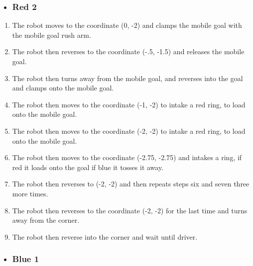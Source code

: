 \begin{itemize}
    \item \subsubsection{Red 2}
\end{itemize}
\begin{enumerate}
    \item The robot moves to the coordinate (0, -2) and clamps the mobile goal with the mobile goal rush arm.
    \item The robot then reverses to the coordinate (-.5, -1.5) and releases the mobile goal.
    \item The robot then turns away from the mobile goal, and reverses into the goal and clamps onto the mobile goal.
    \item The robot then moves to the coordinate (-1, -2) to intake a red ring, to load onto the mobile goal.
    \item The robot then moves to the coordinate (-2, -2) to intake a red ring, to load onto the mobile goal.
    \item The robot then moves to the coordinate (-2.75, -2.75) and intakes a ring, if red it loads onto the goal if blue it tosses it away.
    \item The robot then reverses to (-2, -2) and then repeats steps six and seven three more times.
    \item The robot then reverses to the coordinate (-2, -2) for the last time and turns away from the corner.
    \item The robot then reverse into the corner and wait until driver.
\end{enumerate}
\begin{itemize}
    \item \subsubsection{Blue 1}
\end{itemize}

